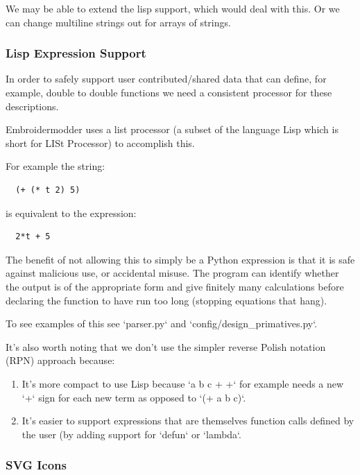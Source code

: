 \documentclass[a4paper, 11pt]{report}
\begin{document}
We may be able to extend the lisp support, which would deal with this. Or we can change multiline strings out for arrays of strings.

\subsubsection{Lisp Expression Support}

In order to safely support user contributed/shared data that can
define, for example, double to double functions we need a consistent
processor for these descriptions.

Embroidermodder uses a list processor (a subset of the language
Lisp which is short for LISt Processor) to accomplish this.

For example the string:

\begin{verbatim}
  (+ (* t 2) 5)
\end{verbatim}

is equivalent to the expression:

\begin{verbatim}
  2*t + 5
\end{verbatim}

The benefit of not allowing this to simply be a Python expression
is that it is safe against malicious use, or accidental misuse.
The program can identify whether the output is of the appropriate
form and give finitely many calculations before declaring the
function to have run too long (stopping equations that hang).

To see examples of this see `parser.py` and
`config/design\_primatives.py`.

It's also worth noting that we don't use the simpler reverse Polish
notation (RPN) approach because:

\begin{enumerate}
\item It's more compact to use Lisp because `a b c + +` for example needs a new `+` sign for each new term as opposed to `(+ a b c)`.
\item It's easier to support expressions that are themselves function calls defined by the user (by adding support for `defun` or `lambda`.
\end{enumerate}

\subsubsection{SVG Icons}
\end{document}
